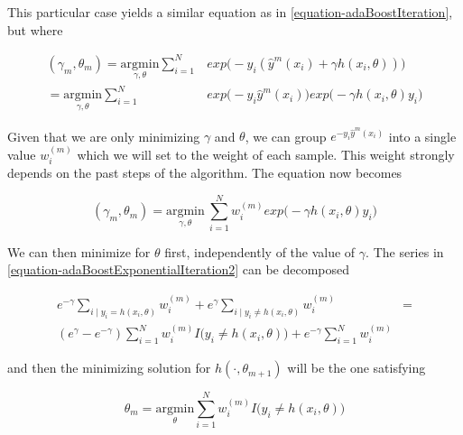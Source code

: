 This particular case yields a similar equation as in \ref{equation-adaBoostIteration}, but where

\begin{equation} \label{equation-adaBoostExponentialIteration}
\begin{split}
(\gamma_{m}, \theta_{m}) = \underset{\gamma, \theta}{\mathrm{argmin}}  \sum_{i=1}^{N} & exp\big( -y_i  (\hat{y}^{m}(x_i) + \gamma h(x_i,\theta) )\big) \\
= \underset{\gamma, \theta}{\mathrm{argmin}}  \sum_{i=1}^{N} & exp\big( -y_i  \hat{y}^{m}(x_i)\big) exp\big(- \gamma h(x_i,\theta)y_i \big)
\end{split}
\end{equation}


Given that we are only minimizing $\gamma$ and $\theta$, we can group $e^{-y_i  \hat{y}^{m}(x_i)}$ into a single value $w_i^{(m)}$ which we will set to the weight of each sample. This weight strongly depends on the past steps of the algorithm.  The equation now becomes


\begin{equation} \label{equation-adaBoostExponentialIteration2}
(\gamma_{m}, \theta_{m}) = \underset{\gamma, \theta}{\mathrm{argmin}} \    \sum_{i=1}^{N}  w_i^{(m)} exp \big(-\gamma h(x_i,\theta)y_i \big)
\end{equation}

We can then minimize for $\theta$ first, independently of the value of $\gamma$. The series in \ref{equation-adaBoostExponentialIteration2} can be decomposed

\begin{equation} \label{equation-adaBoostThetaDecomposition}
\begin{split}
e^{-\gamma} \sum_{i \mid y_i = h(x_i,\theta)} w_i^{(m)}  + e^{\gamma} \sum_{i \mid y_i \neq h(x_i,\theta)} w_i^{(m)} & = \\
( e^{\gamma} - e^{-\gamma}) \sum_{i = 1}^{N} w_i^{(m)} I \big( y_i \neq h(x_i,\theta)   \big)  + e^{-\gamma} \sum_{i = 1}^{N}   w_i^{(m)} &
\end{split}
\end{equation}


and then the minimizing solution for $h(\cdot, \theta_{m+1})$ will be the one satisfying

\begin{equation} \label{equation-adaBoostThetaMinimization}
\theta_{m} = \underset{ \theta}{\mathrm{argmin}}  \sum_{i=1}^{N}  w_i^{(m)} I \big( y_i \neq h(x_i,\theta)   \big)
\end{equation}

